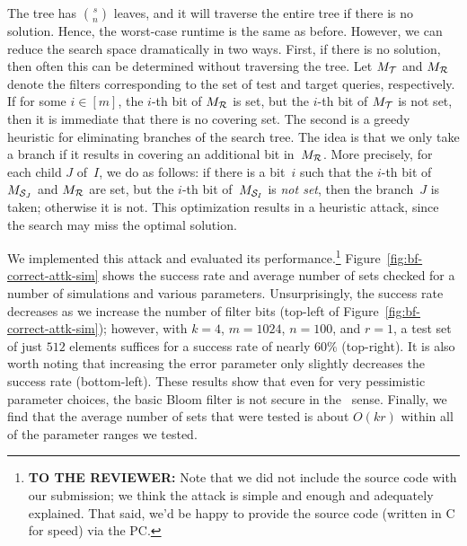 The tree has $\binom{s}{n}$ leaves, and it will traverse the entire tree if
there is no solution. Hence, the worst-case runtime is the same as before.
However, we can reduce the search space dramatically in two ways.
%
First, if there is no solution, then often this can be determined without
traversing the tree. Let $M_{\mathcal{T}}$ and $M_{\mathcal{R}}$ denote the filters
corresponding to the set of test and target queries, respectively.  If for some
$i \in [m]$, the $i$-th bit of $M_{\mathcal{R}}$ is set, but the $i$-th bit of $M_{\mathcal{T}}$
is not set, then it is immediate that there is no covering set.
%
The second is a greedy heuristic for eliminating branches of the search tree.
The idea is that we only take a branch if it results in covering an additional
bit in~$M_{\mathcal{R}}$. More precisely, for each child $J$ of~$I$, we do as follows:
if there is a bit~$i$ such that the $i$-th bit of $M_{\mathcal{S}_J}$ and $M_{\mathcal{R}}$
are set, but the $i$-th bit of~$M_{\mathcal{S}_I}$ is \emph{not set}, then the
branch~$J$ is taken; otherwise it is not.
%
This optimization results in a heuristic attack, since the search may miss the
optimal solution.

We implemented this attack and evaluated its performance.\footnote{\textbf{TO
THE REVIEWER:} Note that we did not include the source code with our submission;
we think the attack is simple and enough and adequately explained. That said,
we'd be happy to provide the source code (written in C for speed) via the PC.}
Figure~\ref{fig:bf-correct-attk-sim} shows the success rate and average number
of sets checked for a number of simulations and various parameters.
%
Unsurprisingly, the success rate decreases as we increase the number of filter
bits (top-left of Figure~\ref{fig:bf-correct-attk-sim}); however, with $k=4$,
$m=1024$, $n=100$, and $r=1$, a test set of just $512$ elements suffices for a
success rate of nearly $60\%$ (top-right). It is also worth noting that
increasing the error parameter only slightly decreases the success rate
(bottom-left). These results show that even for very pessimistic parameter
choices, the basic Bloom filter is not secure in the \ sense.
%
Finally, we find that the average number of sets that were tested is about
$O(kr)$ within all of the parameter ranges we tested.

